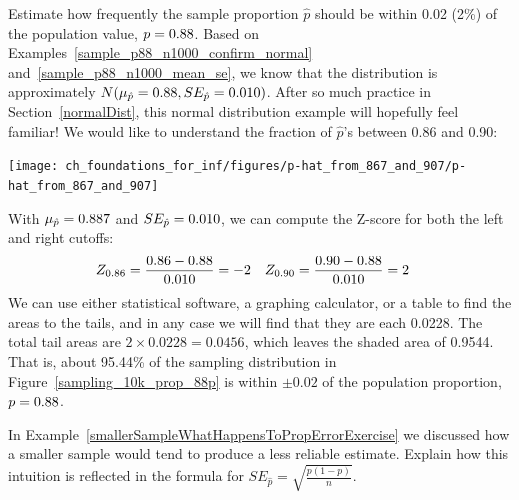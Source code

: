\begin{examplewrap}
\begin{nexample}{Estimate how frequently the sample proportion
$\hat{p}$ should be within 0.02 (2\%) of the population value,
$p = 0.88{}$. Based on
Examples~\ref{sample_p88_n1000_confirm_normal}
and~\ref{sample_p88_n1000_mean_se},
we know that the distribution is approximately
$N(\mu_{\hat{p}} = 0.88{}, SE_{\hat{p}} = 0.010{})$.}
\label{sampling_10k_prop_887p-prop_from_867_to_907}
After so much practice in Section~\ref{normalDist},
this normal distribution example will hopefully feel familiar!
We would like to understand the fraction of $\hat{p}$'s
between 0.86 and 0.90:
\begin{center}
\texttt{[image: ch\_foundations\_for\_inf/figures/p-hat\_from\_867\_and\_907/p-hat\_from\_867\_and\_907]}
\end{center}
With $\mu_{\hat{p}} = 0.887{}$ and
$SE_{\hat{p}} = 0.010{}$,
we can compute the Z-score for both the left and right cutoffs:
\begin{align*}
Z_{0.86}
  &= \frac{0.86 - 0.88{}}{0.010{}}
  = -2
&Z_{0.90}
  &= \frac{0.90 - 0.88{}}{0.010{}}
  = 2
\end{align*}
We can use either statistical software, a graphing calculator,
or a table to find the areas to the tails, and in any case we
will find that they are each 0.0228. The total tail areas are
$2 \times 0.0228 = 0.0456$, which leaves the shaded area of
0.9544. That is, about 95.44\% of the sampling distribution
in Figure~\ref{sampling_10k_prop_88p} is within $\pm0.02$
of the population proportion, $p = 0.88{}$.
\end{nexample}
\end{examplewrap}

\begin{exercisewrap}
\begin{nexercise}
In Example~\ref{smallerSampleWhatHappensToPropErrorExercise}
we discussed how a smaller sample would tend
to produce a less reliable estimate. Explain how this intuition
is reflected in the formula for
$SE_{\hat{p}} = \sqrt{\frac{p (1 - p)}{n}}$.\footnotemark
\end{nexercise}
\end{exercisewrap}


